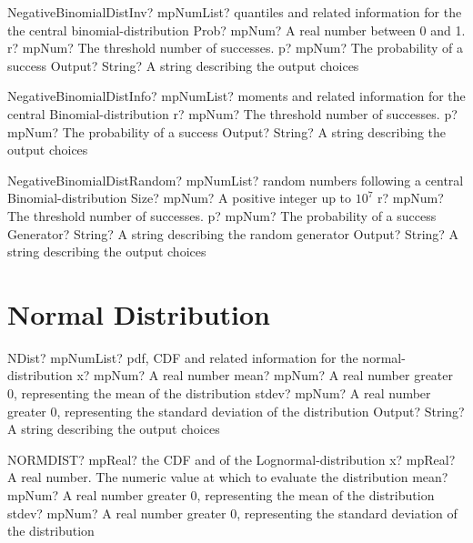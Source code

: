 \documentclass[12pt,a4paper,openany]{book}
\begin{document}
\begin{mpFunctionsExtract}
\mpFunctionFourNotImplemented
{NegativeBinomialDistInv? mpNumList? quantiles and related information for the the central binomial-distribution}
{Prob? mpNum? A real number between 0 and 1.}
{r? mpNum? The threshold number of successes.}
{p? mpNum? The probability of a success}
{Output? String? A string describing the output choices}
\end{mpFunctionsExtract}

\begin{mpFunctionsExtract}
\mpFunctionThreeNotImplemented
{NegativeBinomialDistInfo? mpNumList? moments and related information for the central Binomial-distribution}
{r? mpNum? The threshold number of successes.}
{p? mpNum? The probability of a success}
{Output? String? A string describing the output choices}
\end{mpFunctionsExtract}

\begin{mpFunctionsExtract}
\mpFunctionFiveNotImplemented
{NegativeBinomialDistRandom? mpNumList? random numbers following a central Binomial-distribution}
{Size? mpNum? A positive integer up to $10^7$}
{r? mpNum? The threshold number of successes.}
{p? mpNum? The probability of a success}
{Generator? String? A string describing the random generator}
{Output? String? A string describing the output choices}
\end{mpFunctionsExtract}

\section{Normal Distribution}

\begin{mpFunctionsExtract}
\mpFunctionFourNotImplemented
{NDist? mpNumList? pdf, CDF and related information for the normal-distribution}
{x? mpNum? A real number}
{mean? mpNum? A real number greater 0, representing the mean of the distribution}
{stdev? mpNum? A real number greater 0, representing the standard deviation of the distribution}
{Output? String? A string describing the output choices}
\end{mpFunctionsExtract}

\begin{mpFunctionsExtract}
\mpWorksheetFunctionThreeNotImplemented
{NORMDIST? mpReal? the CDF and of the Lognormal-distribution}
{x? mpReal? A real number. The numeric value at which to evaluate the distribution}
{mean? mpNum? A real number greater 0, representing the mean of the distribution}
{stdev? mpNum? A real number greater 0, representing the standard deviation of the distribution}
\end{mpFunctionsExtract}
\end{document}
